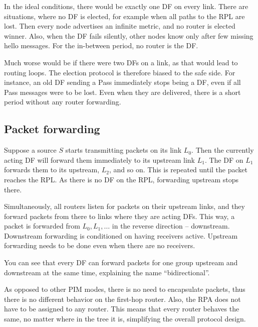 In the ideal conditions, there would be exactly one DF on every link. There are
situations, where no DF is elected, for example when all paths to the RPL are
lost. Then every node advertises an infinite metric, and no router is elected
winner. Also, when the DF fails silently, other nodes know only after few
missing hello messages. For the in-between period, no router is the DF.

Much worse would be if there were two DFs on a link, as that would lead to routing loops. The election protocol
is therefore biased to the safe side. For instance, an old DF sending a Pass immediately
stops being a DF, even if all Pass messages were to be lost. Even when they are
delivered, there is a short period without any router forwarding.

\subsection{Packet forwarding}

Suppose a source $S$ starts transmitting packets on its link $L_0$. Then
the currently acting DF will forward them immediately to its upstream link $L_1$.
The DF on $L_1$ forwards them to its upstream, $L_2$, and so on. This is repeated
until the packet reaches the RPL. As there is no DF on the RPL, forwarding upstream stops
there.

Simultaneously, all routers listen for packets on their upstream links, and they
forward packets from there to links where they are acting DFs. This way, a packet
is forwarded from $L_0, L_1, \dots$ in the reverse direction -- downstream.
Downstream forwarding is conditioned on having receivers active. Upstream
forwarding needs to be done even when there are no receivers.

You can see that every DF can forward packets for one group upstream and
downstream at the same time, explaining the name ``bidirectional''.

As opposed to other PIM modes, there is no need to encapsulate packets, thus
there is no different behavior on the first-hop router. Also, the RPA does not have
to be assigned to any router. This means that every router behaves the same, no
matter where in the tree it is, simplifying the overall protocol design.
